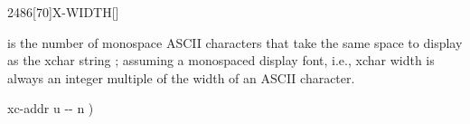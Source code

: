\vspace*{-6ex}
\begin{worddef}{2486}[70]{X-WIDTH}[]%
\item {}

	 is the number of monospace ASCII characters that take the same
	space to display as the xchar string ; assuming a
	monospaced display font, i.e., xchar width is always an integer multiple
	of the width of an ASCII character.

	\begin{implement} %
	\word{:}   xc-addr u -{}- n ) \\
	    \word{+}   \\
	\tab[2]      \word{+} \\
	\tab {}  \word{-}  \word{;}
	\end{implement}
\end{worddef}


